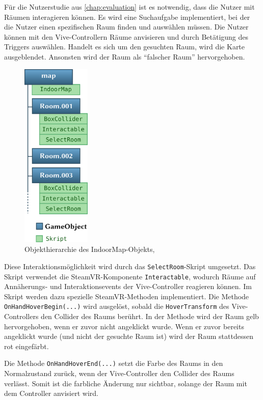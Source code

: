 Für die Nutzerstudie aus \autoref{chap:evaluation} ist es notwendig, dass die Nutzer mit Räumen interagieren können.
Es wird eine Suchaufgabe implementiert, bei der die Nutzer einen spezifischen Raum finden und auswählen müssen.
Die Nutzer können mit den Vive-Controllern Räume anvisieren und durch Betätigung des Triggers auswählen.
Handelt es sich um den gesuchten Raum, wird die Karte ausgeblendet.
Ansonsten wird der Raum als \enquote{falscher Raum} hervorgehoben.

\begin{figure}[tbh]
    \centering
    \includegraphics[height=9cm]{figures/unity_indoor_map}
    \caption{Objekthierarchie des IndoorMap-Objekts,}
    \label{fig:room_hierarchy}
\end{figure}

Diese Interaktionsmöglichkeit wird durch das \lstinline|SelectRoom|-Skript umgesetzt.
Das Skript verwendet die SteamVR-Komponente \lstinline|Interactable|, wodurch Räume auf An\-nä\-he\-rungs- und Interaktionsevents der Vive-Controller reagieren können.
Im Skript werden dazu spezielle SteamVR-Methoden implementiert.
Die Methode \lstinline|OnHandHoverBegin(...)| wird ausgelöst, sobald die \lstinline|HoverTransform| des Vive-Controllers den Collider des Raums berührt.
In der Methode wird der Raum gelb hervorgehoben, wenn er zuvor nicht angeklickt wurde.
Wenn er zuvor bereits angeklickt wurde (und nicht der gesuchte Raum ist) wird der Raum stattdessen rot eingefärbt.

Die Methode \lstinline|OnHandHoverEnd(...)| setzt die Farbe des Raums in den Normalzustand zurück, wenn der Vive-Controller den Collider des Raums verlässt.
Somit ist die farbliche Änderung nur sichtbar, solange der Raum mit dem Controller anvisiert wird.

